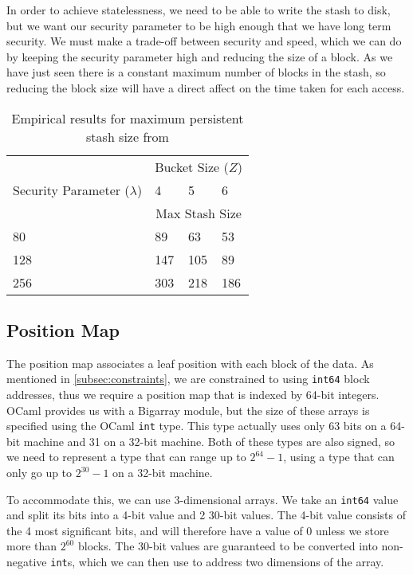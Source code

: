\documentclass[12pt,a4paper,twoside,openright]{report}
\begin{document}
In order to achieve statelessness, we need to be able to write the stash to disk, but we want our security parameter to be high enough that we have long term security. We must make a trade-off between security and speed, which we can do by keeping the security parameter high and reducing the size of a block. As we have just seen there is a constant maximum number of blocks in the stash, so reducing the block size will have a direct affect on the time taken for each access.

\begin{table}
\centering
\begin{tabular}{|l|l|l|l|}
	\hline
	& \multicolumn{3}{c|}{Bucket Size ($Z$)} \\
	\cline{2-4}
	Security Parameter ($\lambda$) & 4 & 5 & 6 \\
	\cline{2-4}
	& \multicolumn{3}{c|}{Max Stash Size} \\
	\hline
	80 & 89 & 63 & 53 \\
	\hline
	128 & 147 & 105 & 89 \\
	\hline
	256 & 303 & 218 & 186 \\
	\hline
\end{tabular}
\caption{Empirical results for maximum persistent stash size from \citet{stefanov2013path}}
\label{tab:stashsizes}
\end{table}

\subsection{Position Map}

The position map associates a leaf position with each block of the data. As mentioned in \cref{subsec:constraints}, we are constrained to using \texttt{int64} block addresses, thus we require a position map that is indexed by 64-bit integers. OCaml provides us with a Bigarray module, but the size of these arrays is specified using the OCaml \texttt{int} type. This type actually uses only 63 bits on a 64-bit machine and 31 on a 32-bit machine. Both of these types are also signed, so we need to represent a type that can range up to $2^{64} - 1$, using a type that can only go up to $2^{30} - 1$ on a 32-bit machine.

To accommodate this, we can use 3-dimensional arrays. We take an \texttt{int64} value and split its bits into a 4-bit value and 2 30-bit values. The 4-bit value consists of the 4 most significant bits, and will therefore have a value of 0 unless we store more than $2^{60}$ blocks. The 30-bit values are guaranteed to be converted into non-negative \texttt{int}s, which we can then use to address two dimensions of the array.
\end{document}
